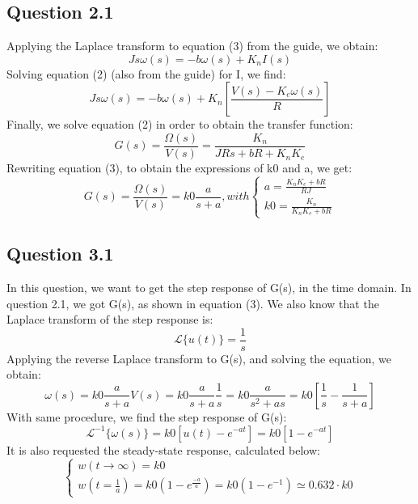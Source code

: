 \documentclass[a4paper,8pt]{extarticle}
\begin{document}
        \subsection*{Question 2.1}
        Applying the Laplace transform to equation (3) from the guide, we obtain:
        \begin{equation}
             Js\omega(s) = -b\omega(s) + K_{n}I(s)
        \end{equation}
        Solving equation (2) (also from the guide) for I, we find:
         \begin{equation}
             Js\omega(s) = -b\omega(s) + K_{n}[ \frac{V(s) - K_{e}\omega(s)}{R}]
        \end{equation}
        Finally, we solve equation (2) in order to obtain the transfer function:
         \begin{equation}
             G(s) = \frac{\Omega(s)}{V(s)} = \frac{K_{n}}{JRs + bR + K_{n}K_{e}}
        \end{equation}
        Rewriting equation (3), to obtain the expressions of k0 and a, we get:
        \begin{equation}
             G(s) = \frac{\Omega(s)}{V(s)} = k0\frac{a}{s+a} , with   
             \begin{cases}
             a = \frac{K_{n}K_{e} + bR}{RJ} \\
             k0 = \frac{K_{n}}{K_{n}K_{e} + bR}
             \end{cases}
        \end{equation}
        
        \subsection*{Question 3.1}
        In this question, we want to get the step response of G(s), in the time domain. In question 2.1, we got G(s), as shown in equation (3). We also know that the Laplace transform of the step response is:
         \begin{equation}
             \mathcal{L}\{u(t)\} = \frac{1}{s} 
        \end{equation}
        Applying the reverse Laplace transform to G(s), and solving the equation, we obtain:
         \begin{equation}
             \omega(s) = k0\frac{a}{s+a}V(s) = k0\frac{a}{s+a}\frac{1}{s} = k0\frac{a}{s^2+as} = k0[\frac{1}{s} - \frac{1}{s+a}]
        \end{equation}
        With same procedure, we find the step response of G(s):
          \begin{equation}
             \mathcal{L}^{-1}\{\omega(s)\} = k0[u(t) - e^{-at}] = k0[1 - e^{-at}]
        \end{equation}
        It is also requested the steady-state response, calculated below:
        \begin{equation}
             \begin{cases}
             w(t\to\infty) = k0 \\
             w(t = \frac{1}{a}) = k0(1-e^{\frac{-a}{a}}) = k0(1-e^{-1}) \simeq 0.632\cdot k0
             \end{cases}
        \end{equation}
        \clearpage
\end{document}
